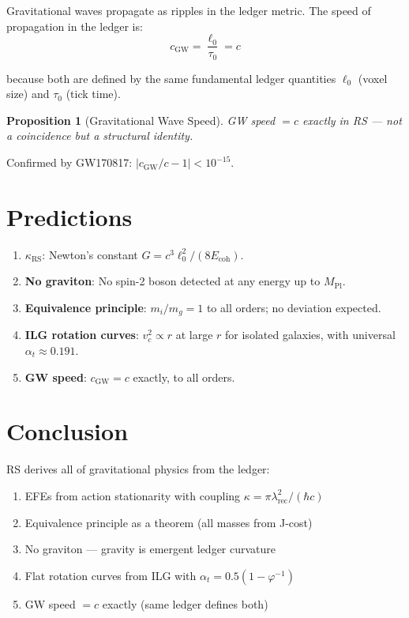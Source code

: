 \documentclass[12pt,a4paper]{article}
\newtheorem{proposition}[theorem]{Proposition}
\theoremstyle{definition}
\theoremstyle{remark}
\begin{document}
Gravitational waves propagate as ripples in the ledger metric. The speed of propagation 
in the ledger is:
\begin{equation}
c_\mathrm{GW} = \frac{\ell_0}{\tau_0} = c
\end{equation}

because both are defined by the same fundamental ledger quantities $\ell_0$ (voxel size) 
and $\tau_0$ (tick time).

\begin{proposition}[Gravitational Wave Speed]
GW speed $= c$ exactly in RS --- not a coincidence but a structural identity.
\end{proposition}

Confirmed by GW170817: $|c_\mathrm{GW}/c - 1| < 10^{-15}$.

\section{Predictions}

\begin{enumerate}
\item \textbf{$\kappa_\mathrm{RS}$}: Newton's constant $G = c^3\ell_0^2/(8E_\mathrm{coh})$.

\item \textbf{No graviton}: No spin-2 boson detected at any energy up to $M_\mathrm{Pl}$.

\item \textbf{Equivalence principle}: $m_i/m_g = 1$ to all orders; no deviation expected.

\item \textbf{ILG rotation curves}: $v_c^2 \propto r$ at large $r$ for isolated galaxies, 
with universal $\alpha_t \approx 0.191$.

\item \textbf{GW speed}: $c_\mathrm{GW} = c$ exactly, to all orders.
\end{enumerate}

\section{Conclusion}

RS derives all of gravitational physics from the ledger:
\begin{enumerate}
\item EFEs from action stationarity with coupling $\kappa = \pi\lambda_\mathrm{rec}^2/(\hbar c)$
\item Equivalence principle as a theorem (all masses from J-cost)
\item No graviton — gravity is emergent ledger curvature
\item Flat rotation curves from ILG with $\alpha_t = 0.5(1-\varphi^{-1})$
\item GW speed $= c$ exactly (same ledger defines both)
\end{enumerate}
\end{document}
